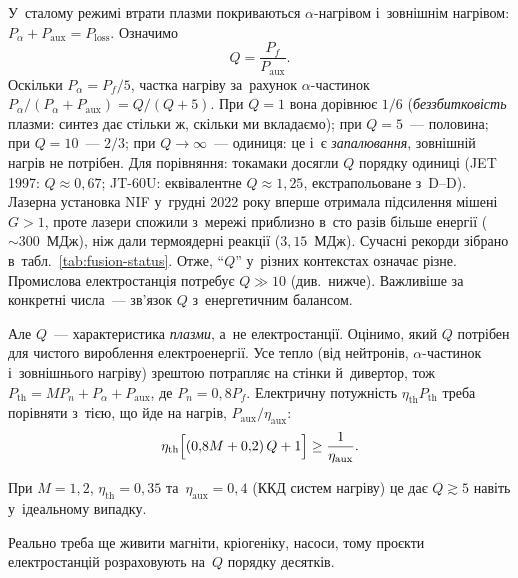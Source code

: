 У~сталому режимі втрати плазми покриваються $\alpha$-нагрівом і~зовнішнім нагрівом:
$P_\alpha+P_{\mathrm{aux}}=P_{\mathrm{loss}}$. Означимо
\begin{equation*}
	Q=\frac{P_f}{P_{\mathrm{aux}}}.
\end{equation*}
Оскільки $P_\alpha=P_f/5$, частка нагріву за~рахунок $\alpha$-частинок
$P_\alpha/(P_\alpha+P_{\mathrm{aux}})=Q/(Q+5)$. При $Q=1$ вона дорівнює $1/6$
(\emph{беззбитковість} плазми: синтез дає стільки ж, скільки ми вкладаємо); при $Q=5$~---
половина; при $Q=10$~--- $2/3$; при $Q\to\infty$~--- одиниця: це і~є \emph{запалювання},
зовнішній нагрів не потрібен. Для порівняння: токамаки досягли $Q$ порядку одиниці (JET 1997: $Q\approx0{,}67$; JT-60U: еквівалентне $Q\approx1{,}25$, екстрапольоване з~D--D).
Лазерна установка NIF у~грудні 2022 року вперше отримала підсилення мішені $G>1$, проте лазери
спожили з~мережі приблизно в~сто разів більше енергії ($\sim300$~МДж), ніж дали термоядерні реакції ($3{,}15$~МДж). Сучасні рекорди зібрано в~табл.~\ref{tab:fusion-status}.
Отже, \enquote{$Q$} у~різних контекстах означає різне. Промислова
електростанція потребує $Q\gg10$ (див.~нижче). Важливіше за конкретні числа~--- зв'язок $Q$ з~енергетичним
балансом.

Але $Q$~--- характеристика \emph{плазми}, а~не електростанції. Оцінимо, який $Q$ потрібен
для чистого вироблення електроенергії. Усе тепло (від нейтронів, $\alpha$-частинок
і~зовнішнього нагріву) зрештою потрапляє на стінки й~дивертор, тож
$P_{\mathrm{th}}=MP_n+P_\alpha+P_{\mathrm{aux}}$, де $P_n=0{,}8P_f$. Електричну потужність
$\eta_{\mathrm{th}}P_{\mathrm{th}}$ треба порівняти з~тією, що йде на нагрів,
$P_{\mathrm{aux}}/\eta_{\mathrm{aux}}$:
\begin{equation*}
	\eta_{\mathrm{th}}\Bigl[(0{,}8M+0{,}2)\,Q+1\Bigr]\geq\frac1{\eta_{\mathrm{aux}}}.
\end{equation*}
\begin{Estimate}
При $M=1{,}2$, $\eta_{\mathrm{th}}=0{,}35$ та~$\eta_{\mathrm{aux}}=0{,}4$ (ККД систем
нагріву) це дає $Q\gtrsim5$ навіть у~ідеальному випадку.
\end{Estimate}

Реально треба ще живити магніти, кріогеніку, насоси, тому проєкти електростанцій розраховують на~$Q$ порядку десятків.

